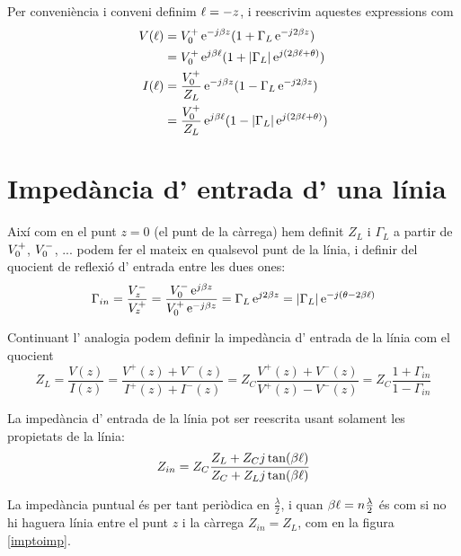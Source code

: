 Per conveniència i conveni definim $\ell = -z $, i reescrivim aquestes expressions com
\begin{subequations}
  \begin{align}
    V(\ell) & = V_0 ^+ \operatorname{e}^{- j \beta z} (1 + \Gamma _L \operatorname{e}^{-j 2 \beta z}) \nonumber \\
         & = V_0 ^+ \operatorname{e}^{ j \beta \ell} (1 + \left\rvert \Gamma _L \right\lvert \operatorname{e}^{j (2 \beta \ell + \theta)}) \\
    I(\ell) &= \frac{V_0 ^+}{Z_L} \operatorname{e}^{ -j \beta z} (1 - \Gamma _L \operatorname{e}^{-j 2 \beta z}) \nonumber \\
\label{guideI}
         &= \frac{V_0 ^+}{Z_L} \operatorname{e}^{ j \beta \ell} (1 - \left\rvert \Gamma _L \right\lvert \operatorname{e}^{j (2 \beta \ell + \theta)}) 
  \end{align}
\end{subequations}

\section{Impedància d' entrada d' una línia}

Així com en el punt $z = 0$ (el punt de la càrrega) hem definit $Z_L$ i $\Gamma _L$  a partir de $V_0 ^+$, $V_0 ^-$, ... podem fer el mateix en qualsevol punt de la línia, i definir del quocient de reflexió d' entrada entre les dues ones:
\begin{equation}
  \Gamma _{in} = \frac{V_z ^- }{V_z ^ +} = \frac{V_0 ^- \operatorname{e}^{j \beta z}}{V_0 ^+ \operatorname{e}^{-j \beta z}} = \Gamma _L \operatorname{e}^{j 2 \beta z} = \left\rvert  \Gamma _L  \right\lvert \operatorname{e}^{- j (\theta -2 \beta \ell)}
\end{equation}

Continuant l' analogia podem definir la impedància d' entrada de la línia com el quocient
\begin{equation}
  Z_L = \frac{V(z)}{I(z)} = \frac{V^+ (z) + V^-(z)}{I^+(z) + I^- (z)} = Z_C \frac{V^+ (z) + V^-(z)}{V^+(z) - V^- (z)} = Z_C \frac{1+ \Gamma _{in}}{1 - \Gamma _{in}}
\end{equation}

La impedància d' entrada de la línia pot ser reescrita usant solament les propietats de la línia:
\begin{equation}
  Z_{in} = Z_C \frac{Z_L + Z_C j \tan (\beta \ell)}{Z_C + Z_L j \tan (\beta \ell)}
\end{equation}

La impedància puntual és per tant periòdica en $\frac{\lambda}{2}$, i quan $\beta \ell = n\frac{\lambda}{2}$ és com si no hi haguera línia entre el punt $z$ i la càrrega $ Z_{in} = Z_L$, com en la figura \cref{imptoimp}.

